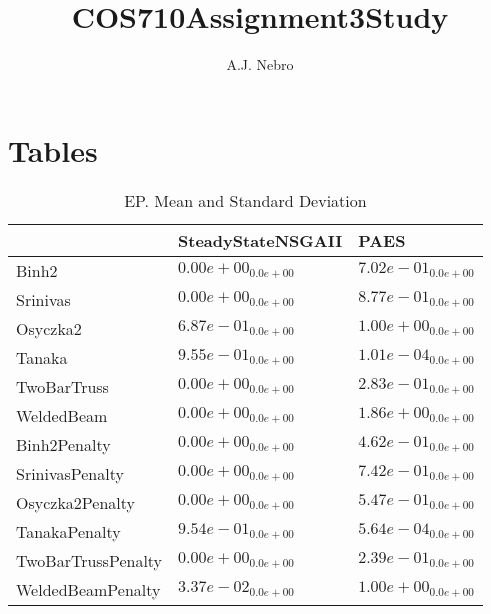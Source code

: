 \documentclass{article}
\title{COS710Assignment3Study}
\author{A.J. Nebro}
\begin{document}
\maketitle
\section{Tables}

\begin{table}
\caption{EP. Mean and Standard Deviation}
\label{table: EP}
\centering
\begin{scriptsize}
\begin{tabular}{lll}
\hline & SteadyStateNSGAII &  PAES\\
\hline 
Binh2 & \cellcolor{gray95}$  0.00e+00_{ 0.0e+00}$ & \cellcolor{gray25}$  7.02e-01_{ 0.0e+00}$ \\
Srinivas & \cellcolor{gray95}$  0.00e+00_{ 0.0e+00}$ & \cellcolor{gray25}$  8.77e-01_{ 0.0e+00}$ \\
Osyczka2 & \cellcolor{gray95}$  6.87e-01_{ 0.0e+00}$ & \cellcolor{gray25}$  1.00e+00_{ 0.0e+00}$ \\
Tanaka & \cellcolor{gray25}$  9.55e-01_{ 0.0e+00}$ & \cellcolor{gray95}$  1.01e-04_{ 0.0e+00}$ \\
TwoBarTruss & \cellcolor{gray95}$  0.00e+00_{ 0.0e+00}$ & \cellcolor{gray25}$  2.83e-01_{ 0.0e+00}$ \\
WeldedBeam & \cellcolor{gray95}$  0.00e+00_{ 0.0e+00}$ & \cellcolor{gray25}$  1.86e+00_{ 0.0e+00}$ \\
Binh2Penalty & \cellcolor{gray95}$  0.00e+00_{ 0.0e+00}$ & \cellcolor{gray25}$  4.62e-01_{ 0.0e+00}$ \\
SrinivasPenalty & \cellcolor{gray95}$  0.00e+00_{ 0.0e+00}$ & \cellcolor{gray25}$  7.42e-01_{ 0.0e+00}$ \\
Osyczka2Penalty & \cellcolor{gray95}$  0.00e+00_{ 0.0e+00}$ & \cellcolor{gray25}$  5.47e-01_{ 0.0e+00}$ \\
TanakaPenalty & \cellcolor{gray25}$  9.54e-01_{ 0.0e+00}$ & \cellcolor{gray95}$  5.64e-04_{ 0.0e+00}$ \\
TwoBarTrussPenalty & \cellcolor{gray95}$  0.00e+00_{ 0.0e+00}$ & \cellcolor{gray25}$  2.39e-01_{ 0.0e+00}$ \\
WeldedBeamPenalty & \cellcolor{gray95}$  3.37e-02_{ 0.0e+00}$ & \cellcolor{gray25}$  1.00e+00_{ 0.0e+00}$ \\
\hline
\end{tabular}
\end{scriptsize}
\end{table}
\end{document}
